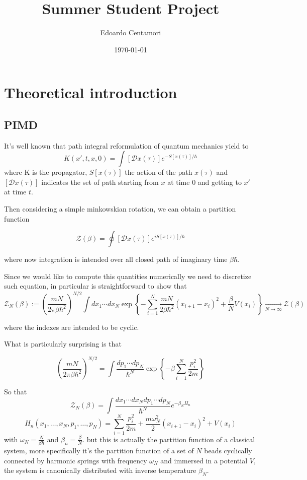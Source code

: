 \documentclass[10pt,a4paper]{article}
\author{Edoardo Centamori}
\title{Summer Student Project}
\begin{document}
\date{\today}
\maketitle
        
\section{Theoretical introduction}

\subsection{PIMD}
It's well known that path integral reformulation of quantum mechanics yield to 
\[K(x',t,x,0)=\int [\mathcal{D}x(\tau)]e^{-S[x(\tau)]/\hbar} \]
where K is the propagator, $S[x(\tau)]$ the action of the path $x(\tau)$ and $[\mathcal{D}x(\tau)]$ indicates the set of path starting from $x$ at time $0$ and getting to $x'$ at time $t$.

Then considering a simple minkowskian rotation, we can obtain a partition function

\[\mathcal{Z}(\beta)=\oint [\mathcal{D}x(\tau)]e^{iS[x(\tau)]/\hbar} \]

where now integration is intended over all closed path of imaginary time $\beta\hbar$.

Since we would like to compute this quantities numerically we need to discretize such equation, in particular is straightforward to show that
\[ \mathcal{Z}_N(\beta):= \left( \frac{mN}{2\pi \beta \hbar^2}  \right)^{N/2} \int dx_1\cdots dx_N \exp \left\{ -\sum_{i=1}^{N}\frac{mN}{2\beta\hbar^2}(x_{i+1}-x_i)^2+\frac{\beta}{N}V(x_i)  \right\} \xrightarrow[N\rightarrow \infty]{} \mathcal{Z}(\beta)\]

where the indexes are intended to be cyclic.

What is particularly surprising is that 

\[ \left( \frac{mN}{2\pi \beta \hbar^2}  \right)^{N/2} = \int \frac{dp_1\cdots dp_N}{\hbar^N} \exp\left\{ -\beta\sum_{i=1}^{N}\frac{ p_i^2}{2m} \right\} \]

So that 
\[\mathcal{Z}_N(\beta)= \int \frac{dx_1\cdots dx_Ndp_1\cdots dp_N}{\hbar^N} e^{-\beta_N H_n}   \]
\[ H_n(x_1,\dots,x_N,p_1,\dots,p_N)= \sum_{i=1}^{N}\frac{ p_i^2}{2m} + \frac{m\omega_N^2}{2}(x_{i+1}-x_i)^2+V(x_i)\]
with $\omega_N=\frac{N}{\beta\hbar}$ and $\beta_n=\frac{\beta}{N}$.
but this is actually the partition function of a classical system, more specifically it's the partition function of a set of $N$ beads cyclically connected by harmonic springs with frequency $\omega_N$ and immersed in a potential $V$, the system is canonically distributed with inverse temperature $\beta_N$.
\vspace{15pt}
\end{document}
